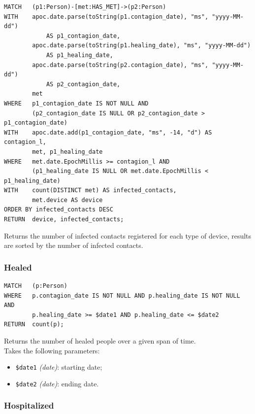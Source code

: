\documentclass[12pt, a4paper]{article}
\begin{document}
\begin{tcolorbox}[fontupper=\scriptsize]
    \begin{verbatim}
MATCH   (p1:Person)-[met:HAS_MET]->(p2:Person)
WITH    apoc.date.parse(toString(p1.contagion_date), "ms", "yyyy-MM-dd") 
            AS p1_contagion_date,
        apoc.date.parse(toString(p1.healing_date), "ms", "yyyy-MM-dd") 
            AS p1_healing_date,
        apoc.date.parse(toString(p2.contagion_date), "ms", "yyyy-MM-dd") 
            AS p2_contagion_date,
        met
WHERE   p1_contagion_date IS NOT NULL AND
        (p2_contagion_date IS NULL OR p2_contagion_date > p1_contagion_date)
WITH    apoc.date.add(p1_contagion_date, "ms", -14, "d") AS contagion_l,
        met, p1_healing_date
WHERE   met.date.EpochMillis >= contagion_l AND
        (p1_healing_date IS NULL OR met.date.EpochMillis < p1_healing_date)
WITH    count(DISTINCT met) AS infected_contacts, 
        met.device AS device
ORDER BY infected_contacts DESC
RETURN  device, infected_contacts;
    \end{verbatim}
\end{tcolorbox}

\noindent %
Returns the number of infected contacts registered for each type of device, 
results are sorted by the number of infected contacts. 

\subsubsection{Healed}
\begin{tcolorbox}[fontupper=\scriptsize]
    \begin{verbatim}
MATCH   (p:Person)
WHERE   p.contagion_date IS NOT NULL AND p.healing_date IS NOT NULL AND
        p.healing_date >= $date1 AND p.healing_date <= $date2
RETURN  count(p);
    \end{verbatim}
\end{tcolorbox}

\noindent %
Returns the number of healed people over a given span of time. \\
Takes the following parameters: 
\begin{itemize}
    \item \texttt{\$date1} \emph{(date)}: starting date;
    \item \texttt{\$date2} \emph{(date)}: ending date.
\end{itemize}

\subsubsection{Hospitalized}
\end{document}
